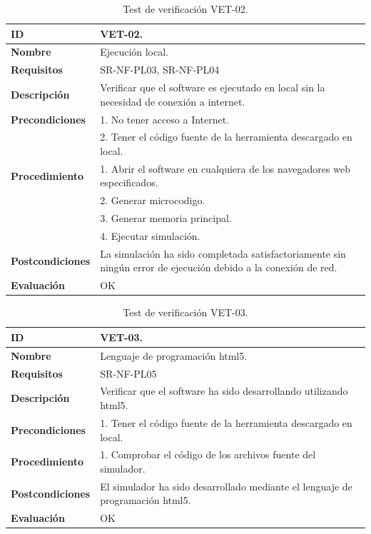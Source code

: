 \begin{center}
\begin{table}[htbp]
\centering
{}
\caption{Test de verificación VET-02.}
\begin{tabular}{@{}p{2.5cm} p{13cm}@{}} 
\toprule
\textbf{ID} 					& VET-02. \\
\midrule
\textbf{Nombre} 				& Ejecución local. \\
\midrule
\textbf{Requisitos} 		& SR-NF-PL03, SR-NF-PL04\\
\midrule
\textbf{Descripción} 		& Verificar que el \gls{software} es ejecutado en local sin la necesidad de conexión a internet. \\
\midrule
\textbf{Precondiciones}		& 1. No tener acceso a Internet.\\
											& 2. Tener el código fuente de la herramienta descargado en local.\\
\midrule
\textbf{Procedimiento}			& 1. Abrir el \gls{software} en cualquiera de los navegadores web especificados. \\
							& 2. Generar \gls{microcodigo}.\\
							& 3. Generar memoria principal.\\
							& 4. Ejecutar simulación.\\
\midrule
\textbf{Postcondiciones} 		&  La simulación ha sido completada satisfactoriamente sin ningún error de ejecución debido a la conexión de red.\\
\midrule
\textbf{Evaluación} 			& OK \\
\bottomrule
\end{tabular}
\label{tab:vet02}
\end{table}
\end{center}

\vspace{-2cm}


\begin{center}
\begin{table}[htbp]
\centering
\caption{Test de verificación VET-03.}
\begin{tabular}{@{}p{2.5cm} p{13cm}@{}} 
\toprule
\textbf{ID} 					& VET-03. \\
\midrule
\textbf{Nombre} 				& Lenguaje de programación \acrshort{html}5. \\
\midrule
\textbf{Requisitos} 		& SR-NF-PL05\\
\midrule
\textbf{Descripción} 		& Verificar que el \gls{software} ha sido desarrollando utilizando \acrshort{html}5. \\
\midrule
\textbf{Precondiciones}		& 1. Tener el código fuente de la herramienta descargado en local. \\
\midrule
\textbf{Procedimiento}		& 1. Comprobar el código de los archivos fuente del simulador.\\
\midrule
\textbf{Postcondiciones} 		&  El simulador ha sido desarrollado mediante el lenguaje de programación \acrshort{html}5.\\
\midrule
\textbf{Evaluación} 			& OK \\
\bottomrule
\end{tabular}
\label{tab:vet03}
\end{table}
\end{center}

